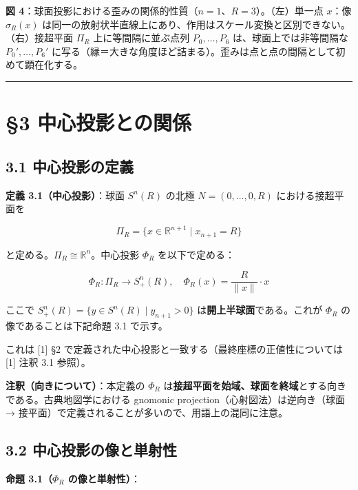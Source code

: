 \documentclass[
]{ltjsarticle}
\begin{document}
\textbf{図
4}：球面投影における歪みの関係的性質（\(n=1\)、\(R=3\)）。（左）単一点
\(x\)：像 \(\sigma_R(x)\)
は同一の放射状半直線上にあり、作用はスケール変換と区別できない。（右）接超平面
\(\Pi_R\) 上に等間隔に並ぶ点列 \(P_0, \ldots, P_6\)
は、球面上では非等間隔な \(P_0', \ldots, P_6'\)
に写る（縁＝大きな角度ほど詰まる）。歪みは点と点の間隔として初めて顕在化する。

\begin{center}\rule{0.5\linewidth}{0.5pt}\end{center}

\section{§3
中心投影との関係}\label{ux4e2dux5fc3ux6295ux5f71ux3068ux306eux95a2ux4fc2}

\subsection{3.1
中心投影の定義}\label{ux4e2dux5fc3ux6295ux5f71ux306eux5b9aux7fa9}

\textbf{定義 3.1（中心投影）}：球面 \(S^n(R)\) の北極
\(N = (0, \ldots, 0, R)\) における接超平面を

\[\Pi_R = \{x \in \mathbb{R}^{n+1} \mid x_{n+1} = R\} \tag{3.1}\]

と定める。\(\Pi_R \cong \mathbb{R}^n\)。中心投影 \(\Phi_R\)
を以下で定める：

\[\Phi_R: \Pi_R \to S^n_+(R), \quad \Phi_R(x) = \frac{R}{\|x\|} \cdot x \tag{3.2}\]

ここで \(S^n_+(R) = \{y \in S^n(R) \mid y_{n+1} > 0\}\)
は\textbf{開上半球面}である。これが \(\Phi_R\) の像であることは下記命題
3.1 で示す。

これは {[}1{]} §2
で定義された中心投影と一致する（最終座標の正値性については {[}1{]} 注釈
3.1 参照）。

\textbf{注釈（向きについて）}：本定義の \(\Phi_R\)
は\textbf{接超平面を始域、球面を終域}とする向きである。古典地図学における
gnomonic projection（心射図法）は逆向き（球面 →
接平面）で定義されることが多いので、用語上の混同に注意。

\subsection{3.2
中心投影の像と単射性}\label{ux4e2dux5fc3ux6295ux5f71ux306eux50cfux3068ux5358ux5c04ux6027}

\textbf{命題 3.1（\(\Phi_R\) の像と単射性）}：
\end{document}
